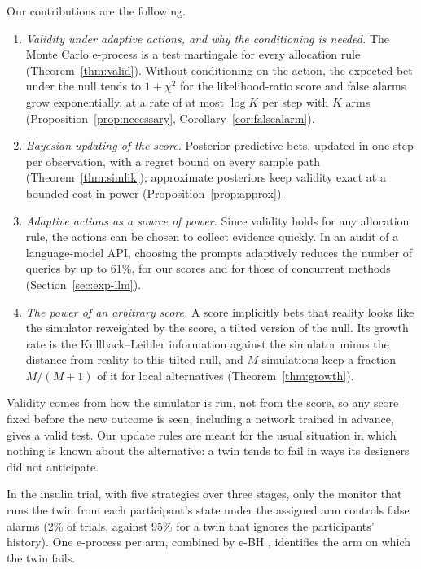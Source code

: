 \documentclass[12pt]{article}
\theoremstyle{remark}
\begin{document}
Our contributions are the following.
\begin{enumerate}
\item \emph{Validity under adaptive actions, and why the conditioning is
needed.} The Monte Carlo e-process is a test martingale for every allocation
rule (Theorem~\ref{thm:valid}). Without conditioning on the action, the
expected bet under the null tends to $1+\chi^2$ for the likelihood-ratio score
and false alarms grow exponentially, at a rate of at most $\log K$ per step
with $K$ arms (Proposition~\ref{prop:necessary},
Corollary~\ref{cor:falsealarm}).
\item \emph{Bayesian updating of the score.} Posterior-predictive bets,
updated in one step per observation, with a regret bound on every sample path
(Theorem~\ref{thm:simlik}); approximate posteriors keep validity exact at a
bounded cost in power (Proposition~\ref{prop:approx}).
\item \emph{Adaptive actions as a source of power.} Since validity holds for
any allocation rule, the actions can be chosen to collect evidence quickly. In
an audit of a language-model API, choosing the prompts adaptively reduces the
number of queries by up to 61\%, for our scores and for those of concurrent
methods (Section~\ref{sec:exp-llm}).
\item \emph{The power of an arbitrary score.} A score implicitly bets that
reality looks like the simulator reweighted by the score, a tilted version of
the null. Its growth rate is the Kullback--Leibler information against the
simulator minus the distance from reality to this tilted null, and $M$
simulations keep a fraction $M/(M+1)$ of it for local alternatives
(Theorem~\ref{thm:growth}).
\end{enumerate}

Validity comes from how the simulator is run, not from the score, so any score
fixed before the new outcome is seen, including a network trained in advance,
gives a valid test. Our update rules are meant for the usual situation in which
nothing is known about the alternative: a twin tends to fail in ways its
designers did not anticipate.

In the insulin trial, with five strategies over three stages, only the monitor
that runs the twin from each participant's state under the assigned arm
controls false alarms (2\% of trials, against 95\% for a twin that ignores the
participants' history). One e-process per arm, combined by e-BH
\citep{xu2021unified}, identifies the arm on which the twin fails.
\end{document}
